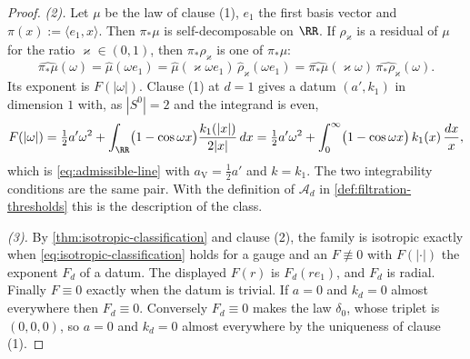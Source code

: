 \begin{proof}
\emph{(2).} Let $\mu$ be the law of clause (1), $e_1$ the first basis vector and $\pi(x) :=
\langle e_1,x\rangle$. Then $\pi_*\mu$ is self-decomposable on $\RR$. If $\rho_\varkappa$ is a
residual of $\mu$ for the ratio $\varkappa \in (0,1)$, then $\pi_*\rho_\varkappa$ is one of
$\pi_*\mu$:
\[
  \widehat{\pi_*\mu}(\omega) = \widehat\mu(\omega e_1)
   = \widehat\mu(\varkappa\omega e_1)\,\widehat\rho_\varkappa(\omega e_1)
   = \widehat{\pi_*\mu}(\varkappa\omega)\,\widehat{\pi_*\rho_\varkappa}(\omega) .
\]
Its exponent is $F(|\omega|)$.
Clause (1) at $d = 1$ gives a datum $(a',k_1)$ in dimension $1$ with, as $|S^0| = 2$ and the
integrand is even,
\[
  F(|\omega|) = \tfrac12 a'\omega^2 + \int_{\RR}\bigl(1 - \cos\omega x\bigr)\frac{k_1(|x|)}{2|x|}\,dx
   = \tfrac12 a'\omega^2 + \int_0^\infty\bigl(1 - \cos\omega x\bigr)\,k_1(x)\,\frac{dx}{x} ,
\]
which is \ref{eq:admissible-line} with $a_{\mathrm V} = \tfrac12 a'$ and $k = k_1$. The two
integrability conditions are the same pair. With the definition of $\mathcal{A}_d$ in
\ref{def:filtration-thresholds} this is the description of the class.

\emph{(3).} By \ref{thm:isotropic-classification} and clause (2), the family is isotropic exactly
when \ref{eq:isotropic-classification} holds for a gauge and an $F \not\equiv 0$ with $F(|\cdot|)$
the exponent $F_d$ of a datum. The displayed $F(r)$ is $F_d(re_1)$, and $F_d$ is radial. Finally
$F \equiv 0$ exactly when the datum is trivial. If $a = 0$ and $k_d = 0$ almost everywhere then
$F_d \equiv 0$. Conversely $F_d \equiv 0$ makes the law $\delta_0$, whose triplet is $(0,0,0)$,
so $a = 0$ and $k_d = 0$ almost everywhere by the uniqueness of clause (1).
\end{proof}


